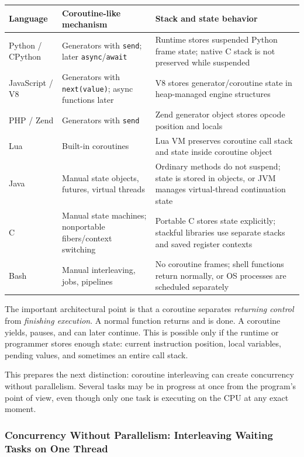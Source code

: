 \begin{center}
\begin{tabular}{|p{}|p{}|p{}|}
\hline
\textbf{Language} & \textbf{Coroutine-like mechanism} & \textbf{Stack and state behavior} \\
\hline
Python / CPython & Generators with \texttt{send}; later \texttt{async}/\texttt{await} & Runtime stores suspended Python frame state; native C stack is not preserved while suspended \\
\hline
JavaScript / V8 & Generators with \texttt{next(value)}; async functions later & V8 stores generator/coroutine state in heap-managed engine structures \\
\hline
PHP / Zend & Generators with \texttt{send} & Zend generator object stores opcode position and locals \\
\hline
Lua & Built-in coroutines & Lua VM preserves coroutine call stack and state inside coroutine object \\
\hline
Java & Manual state objects, futures, virtual threads & Ordinary methods do not suspend; state is stored in objects, or JVM manages virtual-thread continuation state \\
\hline
C & Manual state machines; nonportable fibers/context switching & Portable C stores state explicitly; stackful libraries use separate stacks and saved register contexts \\
\hline
Bash & Manual interleaving, jobs, pipelines & No coroutine frames; shell functions return normally, or OS processes are scheduled separately \\
\hline
\end{tabular}
\end{center}

The important architectural point is that a coroutine separates \emph{returning control} from \emph{finishing execution}. A normal function returns and is done. A coroutine yields, pauses, and can later continue. This is possible only if the runtime or programmer stores enough state: current instruction position, local variables, pending values, and sometimes an entire call stack.

This prepares the next distinction: coroutine interleaving can create concurrency without parallelism. Several tasks may be in progress at once from the program's point of view, even though only one task is executing on the CPU at any exact moment.



\subsubsection{Concurrency Without Parallelism: Interleaving Waiting Tasks on One Thread}

